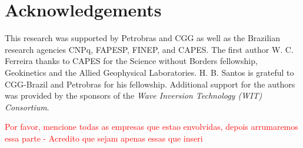 \documentclass{vie16}
\newcommand{\att}[1]{\textcolor{red}{#1}}
\begin{document}
\section{Acknowledgements}

This research was supported by Petrobras and CGG as well as the
Brazilian research agencies CNPq, FAPESP, FINEP, and CAPES. The first author 
W. C. Ferreira thanks to CAPES for the Science without
Borders fellowship, Geokinetics and the Allied Geophysical Laboratories. H. B. Santos is grateful to CGG-Brazil and Petrobras for his 
fellowship. Additional support for the authors was provided by the sponsors 
of the \textit{Wave Inversion Technology (WIT) Consortium}.

\att{Por favor, mencione todas as empresas que estao envolvidas, depois 
arrumaremos essa parte - Acredito que sejam apenas essas que inseri }


\end{document}
